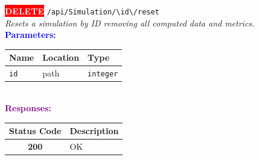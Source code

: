 \begin{tcolorbox}[
    colback=red!5,
    colframe=red,
    arc=2mm,
    boxrule=1pt,
    left=5pt,
    right=5pt,
    top=5pt,
    bottom=5pt
]
\noindent\colorbox{red}{\textcolor{white}{\textbf{DELETE}}} 
\texttt{\large /api/Simulation/\textbackslash{}{id\textbackslash{}}/reset}\\[0.3em]
\textit{Resets a simulation by ID removing all computed data and metrics.}\\[0.3em]
\vspace{0.3em}
\textbf{\textcolor{blue}{Parameters:}}\\[0.2em]
\begin{tabular}{|l|l|l|}
\hline
\rowcolor{gray!20}
\textbf{Name} & \textbf{Location} & \textbf{Type} \\ \hline
\texttt{id} & path & \texttt{integer} \\ \hline
\end{tabular}\\[0.5em]
\vspace{0.3em}
\textbf{\textcolor{purple}{Responses:}}\\[0.2em]
\begin{tabular}{|c|p{10cm}|}
\hline
\rowcolor{gray!20}
\textbf{Status Code} & \textbf{Description} \\ \hline
\colorbox{green!20}{\textbf{200}} & OK \\ \hline
\end{tabular}
\end{tcolorbox}
\vspace{0.5em}

